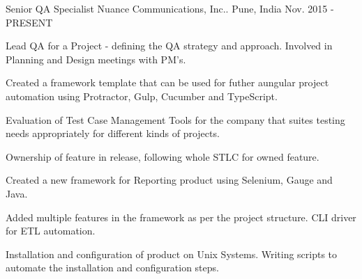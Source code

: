 

\begin{cventries}

  \cventry
    {Senior QA Specialist} %
    {Nuance Communications, Inc..} %
    {Pune, India} %
    {Nov. 2015 - PRESENT} %
    {
      \begin{cvitems} %
	    \item {Lead QA for a Project - defining the QA strategy and approach. Involved in Planning and Design meetings with PM's.}
		\item {Created a framework template that can be used for futher aungular project automation using Protractor, Gulp, Cucumber and TypeScript.}
		\item {Evaluation of Test Case Management Tools for the company that suites testing needs appropriately for different kinds of projects.}
        \item {Ownership of feature in release, following whole STLC for owned feature.}
        \item {Created a new framework for Reporting product using Selenium, Gauge and Java.}
        \item {Added multiple features in the framework as per the project structure. CLI driver for ETL automation.}
        \item {Installation and configuration of product on Unix Systems. Writing scripts to automate the installation and configuration steps.}
      \end{cvitems}
    }


\end{cventries}
